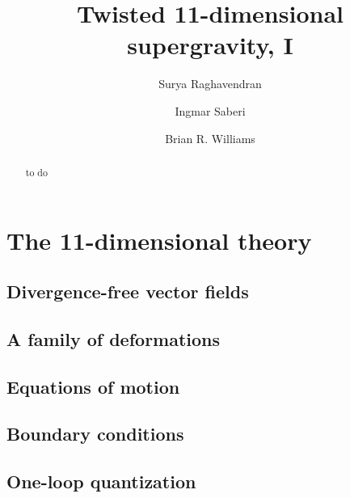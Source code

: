 \documentclass[11pt]{amsart}
\begin{document}
\title{Twisted 11-dimensional supergravity, I}
\author{Surya Raghavendran}
\address{Perimeter Institute}
\author{Ingmar Saberi}
\address{Ludwig-Maximilians-Universit\"at M\"unchen \\ Fakult\"at f\"ur Physik \\ Theresienstra\ss{}e 37 \\ 80333 M\"unchen \\ Deutschland}
\author{Brian R. Williams}
\address{School of Mathematics, University of Edinburgh, Edinburgh, UK}
\begin{abstract}
to do
\end{abstract}
\maketitle

\section{The 11-dimensional theory} 

\subsection{Divergence-free vector fields} 

\subsection{A family of deformations} 


\subsection{Equations of motion}


\subsection{Boundary conditions}


\subsection{One-loop quantization} 

\end{document}

